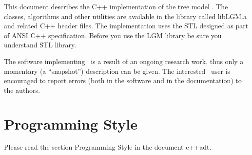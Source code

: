 This document describes the C++ implementation of the tree model \linebreak
\lignum. The classes, algorithms and other utilities are available in the
library called libLGM.a and related C++ header files. The
implementation uses the STL designed 
as part of ANSI C++ specification.  Before  you use the LGM library
be sure you understand STL library.

The software implementing \lignum\ is a result of an ongoing
research work, thus only a momentary (a ``snapshot'') description
can be given. The interested \lignum\ user is encouraged to report
errors (both in the software and in the documentation) to the authors. 


\section{Programming Style}
Please read the section Programming Style in the document c++adt.

